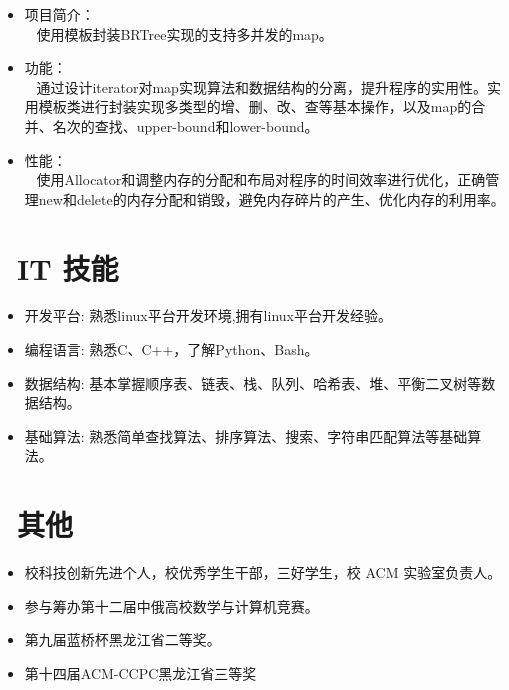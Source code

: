 \documentclass{resume}
\begin{document}
\begin{onehalfspacing}
	\begin{itemize}
		\item 项目简介：
		\\~
		使用模板封装BRTree实现的支持多并发的map。
		\item 功能：
		\\~
		通过设计iterator对map实现算法和数据结构的分离，提升程序的实用性。实用模板类进行封装实现多类型的增、删、改、查等基本操作，以及map的合并、名次的查找、upper-bound和lower-bound。
		\item 性能：
		\\~
		使用Allocator和调整内存的分配和布局对程序的时间效率进行优化，正确管理new和delete的内存分配和销毁，避免内存碎片的产生、优化内存的利用率。		
	\end{itemize}
\end{onehalfspacing}


\section{\faCogs\ IT 技能}
\begin{itemize}[parsep=0.5ex]
	\item 开发平台: 熟悉linux平台开发环境,拥有linux平台开发经验。
	\item 编程语言: 熟悉C、C++，了解Python、Bash。
	\item 数据结构: 基本掌握顺序表、链表、栈、队列、哈希表、堆、平衡二叉树等数据结构。
	\item 基础算法: 熟悉简单查找算法、排序算法、搜索、字符串匹配算法等基础算法。
\end{itemize}

\section{\faInfo\ 其他}
\begin{itemize}[parsep=0.5ex]
  \item 校科技创新先进个人，校优秀学生干部，三好学生，校 ACM 实验室负责人。
  \item 参与筹办第十二届中俄高校数学与计算机竞赛。
  \item 第九届蓝桥杯黑龙江省二等奖。
  \item 第十四届ACM-CCPC黑龙江省三等奖
\end{itemize}

%
%
\end{document}

